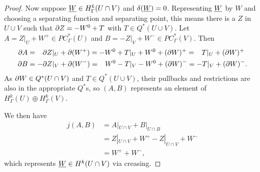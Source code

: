 \begin{proof}
	Now suppose $\underline{W} \in H^k_\Gamma(U \cap V)$ and $\delta(\underline{W}) = 0$.
	Representing $\underline{W}$ by $W$ and choosing a separating function and separating point, this means there is a $Z$ in $U \cup V$ such that $\partial Z = -W^0+T$ with $T \in Q^*(U \cup V)$.
	Let $A = Z|_U+ W^+ \in PC^*_\Gamma(U)$ and $B = -Z|_V +W^- \in PC^*_\Gamma(V)$.
	Then
	\begin{align*}
		\partial A& = \phantom{-}\partial Z|_U+ \partial( W^+) = -W^0+T|_U +W^0+(\partial W)^{+} = \phantom{-}T|_U+(\partial W)^{+}\\
		\partial B& = -\partial Z|_V+ \partial (W^-) = \phantom{-}W^0-T|_V -W^0+(\partial W)^{-} = -T|_V+(\partial W)^{-}.
	\end{align*}
	As $\partial W \in Q^*(U \cap V)$ and $T \in Q^*(U \cup V)$, their pullbacks and restrictions are also in the appropriate $Q^*$s, so $(A,B)$ represents an element of $H^k_\Gamma(U) \oplus H^k_\Gamma(V)$.

	We then have
	\begin{align*}
		j(A,B)& = A|_{U \cap V}+B|_{U \cap B}\\
		& = Z|_{U \cap V}+ W^+ - Z|_{U \cap V} +W^-\\
		& = W^++W^-,
	\end{align*}
	which represents $\underline{W} \in H^k(U \cap V)$ via creasing.
\end{proof}


